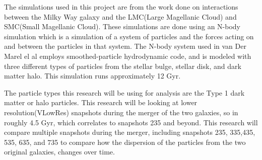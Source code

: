 \documentclass[linenumbers,trackchanges,twocolumn]{aastex7}
\begin{document}
The simulations used in this project are from the work done on interactions between the Milky Way galaxy and the LMC(Large Magellanic Cloud) and SMC(Small Magellanic Cloud).\cite{van_der_Marel_2012} These simulations are done using an N-body simulation which is a simulation of a system of particles and the forces acting on and between the particles in that system. The N-body system used in van Der Marel el al employs smoothed-particle hydrodynamic code, and is modeled with three different types of particles from the stellar bulge, stellar disk, and dark matter halo. This simulation runs approximately 12 Gyr.

The particle types this research will be using for analysis are the Type 1 dark matter or halo particles. This research will be looking at lower resolution(VLowRes) snapshots during the merger of the two galaxies, so in roughly 4.5 Gyr, which correlates to snapshots 235 and beyond. This research will compare multiple snapshots during the merger, including snapshots 235, 335,435, 535, 635, and 735 to compare how the dispersion of the particles from the two original galaxies, changes over time. 
\end{document}
